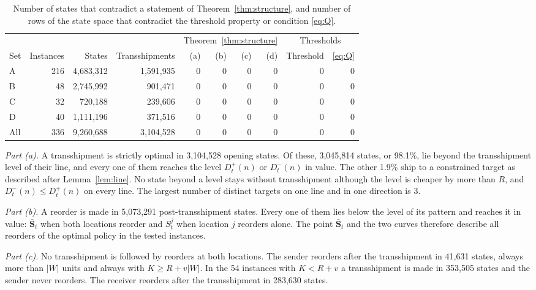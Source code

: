 \documentclass[11pt]{article}
\renewcommand{\vec}[1]{\boldsymbol{#1}}
\theoremstyle{definition}
\begin{document}
\begin{table}[h]
\centering
\small
\setlength{\tabcolsep}{4pt}
\caption{Number of states that contradict a statement of Theorem~\ref{thm:structure}, and number of rows of the state space that contradict the threshold property or condition \eqref{eq:Q}.}\label{tab:checks}
\begin{tabular}{lrrrrrrrrr}
\toprule
 & & & & \multicolumn{4}{c}{Theorem~\ref{thm:structure}} & \multicolumn{2}{c}{Thresholds} \\
\cmidrule(lr){5-8}\cmidrule(lr){9-10}
Set & Instances & States & Transshipments & (a) & (b) & (c) & (d) & Threshold & \eqref{eq:Q} \\
\midrule
A & 216 & 4,683,312 & 1,591,935 & 0 & 0 & 0 & 0 & 0 & 0 \\
B & 48 & 2,745,992 & 901,471 & 0 & 0 & 0 & 0 & 0 & 0 \\
C & 32 & 720,188 & 239,606 & 0 & 0 & 0 & 0 & 0 & 0 \\
D & 40 & 1,111,196 & 371,516 & 0 & 0 & 0 & 0 & 0 & 0 \\
\midrule
All & 336 & 9,260,688 & 3,104,528 & 0 & 0 & 0 & 0 & 0 & 0 \\
\bottomrule
\end{tabular}
\end{table}

\emph{Part (a).} A transshipment is strictly optimal in 3,104,528 opening states. Of these, 3,045,814 states, or 98.1\%, lie beyond the transshipment level of their line, and every one of them reaches the level $D^+_t(n)$ or $D^-_t(n)$ in value. The other 1.9\% ship to a constrained target as described after Lemma~\ref{lem:line}. No state beyond a level stays without transshipment although the level is cheaper by more than $R$, and $D^-_t(n)\le D^+_t(n)$ on every line. The largest number of distinct targets on one line and in one direction is 3.

\emph{Part (b).} A reorder is made in 5,073,291 post-transshipment states. Every one of them lies below the level of its pattern and reaches it in value: $\bar{\vec{S}}_t$ when both locations reorder and $S^j_t$ when location $j$ reorders alone. The point $\bar{\vec{S}}_t$ and the two curves therefore describe all reorders of the optimal policy in the tested instances.

\emph{Part (c).} No transshipment is followed by reorders at both locations. The sender reorders after the transshipment in 41,631 states, always more than $|W|$ units and always with $K\ge R+v|W|$. In the 54 instances with $K<R+v$ a transshipment is made in 353,505 states and the sender never reorders. The receiver reorders after the transshipment in 283,630 states.
\end{document}
